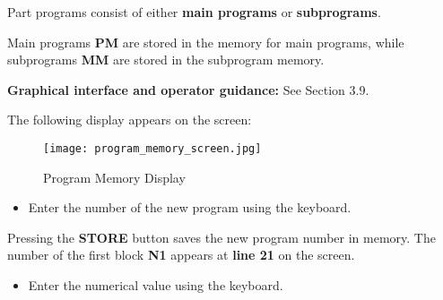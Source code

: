 Part programs consist of either \textbf{main programs} or \textbf{subprograms}.

Main programs \textbf{PM} are stored in the memory for main programs, while subprograms \textbf{MM} are stored in the subprogram memory.

\textbf{Graphical interface and operator guidance:} See Section 3.9.

\procedure

\begin{itemize}
    \vspace{.6cm}
\end{itemize}

\vspace{.5cm}

The following display appears on the screen:

\begin{figure}[h]
    \centering
    \texttt{[image: program\_memory\_screen.jpg]}
    \caption{Program Memory Display}
\end{figure}
\newpage

\begin{itemize}
    \vspace{.5cm}
    \item Enter the number of the new program using the keyboard.
\end{itemize}

\vspace{.5cm}

Pressing the \textbf{STORE} button saves the new program number in memory. The number of the first block \textbf{N1} appears at \textbf{line 21} on the screen.

\begin{itemize}
    \item Enter the numerical value using the keyboard.
    \vspace{.1cm}
\end{itemize}

